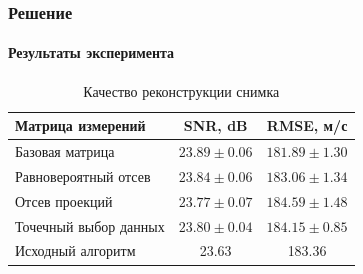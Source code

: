 \documentclass{beamer}
\begin{document}
\begin{frame}
\frametitle{Решение}
\framesubtitle{Результаты эксперимента}
\begin{table}\small
\caption{\small Качество реконструкции снимка}
\centering
\begin{tabular}{| l | c | c | }
    \hline
    Матрица измерений & SNR, dB & RMSE, м/с \\
    \hline
    Базовая матрица & $\mathbf{23.89 \pm 0.06}$ & $\mathbf{181.89 \pm 1.30}$ \\
    Равновероятный отсев & $23.84 \pm 0.06$ & $183.06 \pm 1.34$ \\
    Отсев проекций & $23.77 \pm 0.07$ & $184.59 \pm 1.48$ \\
    Точечный выбор данных & $23.80 \pm 0.04$ & $184.15 \pm 0.85$ \\
    \hline
    Исходный алгоритм & 23.63 & 183.36 \\
    \hline
\end{tabular}
\end{table}


\end{frame}
\end{document}
